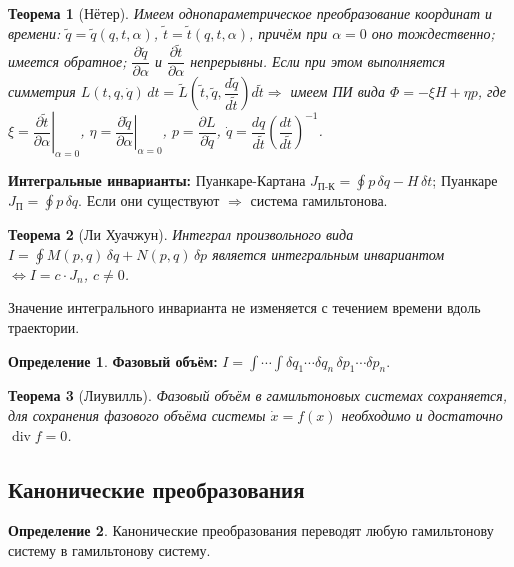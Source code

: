 \documentclass[12pt, a4paper]{article}
\theoremstyle{plain}
\newtheorem{theorem}{Теорема}[section] %
\theoremstyle{definition}
\newtheorem{definition}{Определение}[section]
\theoremstyle{remark}
\begin{document}
\begin{theorem}[Нётер]
Имеем однопараметрическое преобразование координат и времени: $\tilde{q} = \tilde{q}(q, t, \alpha)$, $\tilde{t} = \tilde{t}(q, t, \alpha)$, причём при $\alpha = 0$ оно тождественно; имеется обратное; $\dfrac{\partial \tilde{q}}{\partial \alpha}$ и $\dfrac{\partial \tilde{t}}{\partial \alpha}$ непрерывны. Если при этом выполняется симметрия $L(t, q, \dot{q})\, dt = \tilde{L}\!\left(\tilde{t}, \tilde{q}, \dfrac{d\tilde{q}}{d\tilde{t}}\right) d\tilde{t} \Rightarrow$ имеем ПИ вида $\Phi = -\xi H + \eta p$, где $\xi = \left.\dfrac{\partial \tilde{t}}{\partial \alpha}\right|_{\alpha=0}$, $\eta = \left.\dfrac{\partial \tilde{q}}{\partial \alpha}\right|_{\alpha=0}$, $p = \dfrac{\partial L}{\partial \dot{q}}$, $\dot{q} = \dfrac{dq}{d\tilde{t}}\left(\dfrac{dt}{d\tilde{t}}\right)^{-1}$. 
\end{theorem}

\textbf{Интегральные инварианты:} Пуанкаре-Картана $J_{\text{П-К}} = \oint p\,\delta q - H\,\delta t$; Пуанкаре $J_{\text{П}} = \oint p\,\delta q$. Если они существуют $ \Rightarrow$ система гамильтонова.

\begin{theorem}[Ли Хуачжун]
Интеграл произвольного вида $I = \oint M(p, q)\,\delta q + N(p, q)\,\delta p$ является интегральным инвариантом  $\Leftrightarrow I = c \cdot J_n$, $c \neq 0$.
    
\end{theorem}

Значение интегрального инварианта не изменяется с течением времени вдоль траектории.

\begin{definition}
\textbf{Фазовый объём:} $I = \int\!\cdots\!\int \delta q_1 \cdots \delta q_n\, \delta p_1 \cdots \delta p_n$.
    
\end{definition}


\begin{theorem}[Лиувилль]
Фазовый объём в гамильтоновых системах сохраняется, для сохранения фазового объёма системы $\dot{x} = f(x)$ необходимо и достаточно $\operatorname{div} f = 0$.
    
\end{theorem}

\subsection{Канонические преобразования}
\begin{definition}
Канонические преобразования переводят любую гамильтонову систему в гамильтонову систему.
    
\end{definition}
\end{document}
